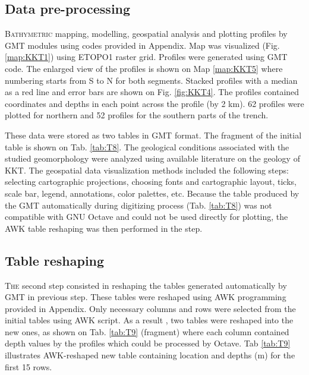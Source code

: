 \documentclass[11pt,a4paper]{report}
\begin{document}
{%
\subsection{Data pre-processing}
\lettrine[lines=3]{\color{Sepia}B}{athymetric} mapping, modelling, geospatial analysis and plotting profiles by \ac{GMT} modules using codes provided in Appendix. Map was visualized (Fig. \ref{map:KKT1}) using \ac{ETOPO1} raster grid. Profiles were generated using \ac{GMT} code. The enlarged view of the profiles is shown on Map \ref{map:KKT5} where numbering starts from S to N for both segments. Stacked profiles with a median as a red line and error bars are shown on Fig. \ref{fig:KKT4}. The profiles contained coordinates and depths in each point across the profile (by 2 km). 62 profiles were plotted for northern and 52 profiles for the southern parts of the trench. 

These data were stored as two tables in \ac{GMT} format. The fragment of the initial table is shown on Tab. \ref{tab:T8}. The geological conditions associated with the studied geomorphology were analyzed using available literature on the geology of \ac{KKT}. The geospatial data visualization methods included the following steps: selecting cartographic projections, choosing fonts and cartographic layout, ticks, scale bar, legend, annotations, color palettes, etc. Because the table produced by the \ac{GMT} automatically during digitizing process (Tab. \ref{tab:T8}) was not compatible with GNU Octave and could not be used directly for plotting, the AWK table reshaping was then performed in the  step. 

\subsection{Table reshaping}
\lettrine[lines=3]{\color{darkgray}T}{he} second step consisted in reshaping the tables generated automatically by GMT in previous step. These tables were reshaped using AWK programming provided in Appendix. Only necessary columns and rows were selected from the initial tables using AWK script. As a result , two tables were reshaped into the new ones, as shown on Tab. \ref{tab:T9} (fragment) where each column contained depth values by the profiles which could be processed by Octave. Tab \ref{tab:T9} illustrates  AWK-reshaped new table containing location and depths (m) for the first 15 rows. 

}
\end{document}
